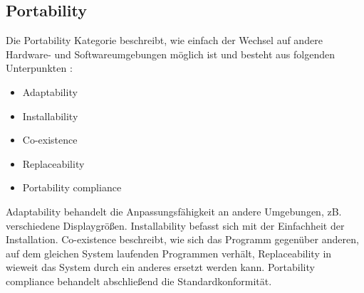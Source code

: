 \subsection{Portability}
Die Portability Kategorie beschreibt, wie einfach der Wechsel auf andere Hardware- und Softwareumgebungen möglich ist und besteht aus folgenden Unterpunkten \cite[S. 7]{ISO_SQ}:

\begin{itemize}
  \item \glqq Adaptability\grqq
  \item \glqq Installability\grqq
  \item \glqq Co-existence\grqq
  \item \glqq Replaceability\grqq
  \item \glqq Portability compliance\grqq
\end{itemize}

Adaptability behandelt die Anpassungsfähigkeit an andere Umgebungen, zB. verschiedene Displaygrößen. Installability befasst sich mit der Einfachheit der Installation.  Co-existence beschreibt, wie sich das Programm gegenüber anderen, auf dem gleichen System laufenden Programmen verhält,   Replaceability in wieweit das System durch ein anderes ersetzt werden kann. Portability compliance behandelt abschließend die Standardkonformität. \cite[S. 11]{ISO_SQ}